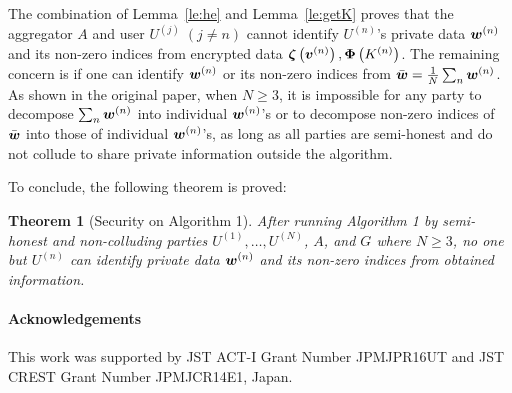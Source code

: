 \documentclass[10pt,twocolumn,letterpaper]{article}
\newtheorem{theorem}{Theorem}
\def\vct#1{\mbox{\boldmath $#1$}}
\def\ui#1{^{(#1)}}
\def\he#1{\vct{\zeta}\left(#1\right)}
\def\dperm#1{\vct{\Phi}\left(#1\right)}
\def\wui{\vct{w}\ui{n}}
\begin{document}
The combination of Lemma~\ref{le:he} and Lemma~\ref{le:getK} proves that the aggregator $A$ and user $U\ui{j}\;(j\neq n)$ cannot identify $U\ui{n}$'s private data $\wui$ and its non-zero indices from encrypted data $\he{\vct{v}\ui{n}}, \dperm{K\ui{n}}$. The remaining concern is if one can identify $\wui$ or its non-zero indices from $\bar{\vct{w}} = \frac{1}{N}\sum_n \wui$. As shown in the original paper, when $N\geq 3$, it is impossible for any party to decompose $\sum_n \wui$ into individual $\wui$'s or to decompose non-zero indices of $\bar{\vct{w}}$ into those of individual $\wui$'s, as long as all parties are semi-honest and do not collude to share private information outside the algorithm.

To conclude, the following theorem is proved:
\begin{theorem}[Security on Algorithm 1]
After running Algorithm 1 by semi-honest and non-colluding parties $U\ui{1},\dots,U\ui{N}$, $A$, and $G$ where $N\geq 3$, no one but $U\ui{n}$ can identify private data $\wui$ and its non-zero indices from obtained information.
\end{theorem}


\paragraph{Acknowledgements}
This work was supported by JST ACT-I Grant Number JPMJPR16UT and JST CREST Grant Number JPMJCR14E1, Japan.

\balance{\small


}
\end{document}
